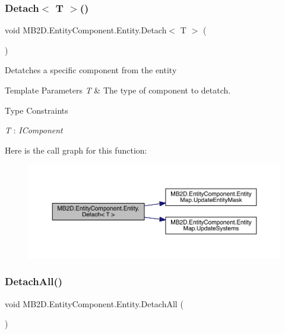\subsubsection{\texorpdfstring{Detach$<$ T $>$()}{Detach< T >()}}
{\footnotesize\ttfamily void M\+B2\+D.\+Entity\+Component.\+Entity.\+Detach$<$ T $>$ (\begin{DoxyParamCaption}{ }\end{DoxyParamCaption})\hspace{0.3cm}{\ttfamily [inline]}}



Detatches a specific component from the entity 


\begin{DoxyTemplParams}{Template Parameters}
{\em T} & The type of component to detatch.\\
\hline
\end{DoxyTemplParams}
\begin{Desc}
\item[Type Constraints]\begin{description}
\item[{\em T} : {\em I\+Component}]\end{description}
\end{Desc}
Here is the call graph for this function\+:
\nopagebreak
\begin{figure}[H]
\begin{center}
\leavevmode
\includegraphics[width=350pt]{class_m_b2_d_1_1_entity_component_1_1_entity_a9194f3b1f3370d2ecb47efe077ba4050_cgraph}
\end{center}
\end{figure}
\hypertarget{class_m_b2_d_1_1_entity_component_1_1_entity_a5c006a368383ba7b17653d9f958ceaf8}{}\label{class_m_b2_d_1_1_entity_component_1_1_entity_a5c006a368383ba7b17653d9f958ceaf8} 
\subsubsection{\texorpdfstring{Detach\+All()}{DetachAll()}}
{\footnotesize\ttfamily void M\+B2\+D.\+Entity\+Component.\+Entity.\+Detach\+All (\begin{DoxyParamCaption}{ }\end{DoxyParamCaption})\hspace{0.3cm}{\ttfamily [inline]}}



